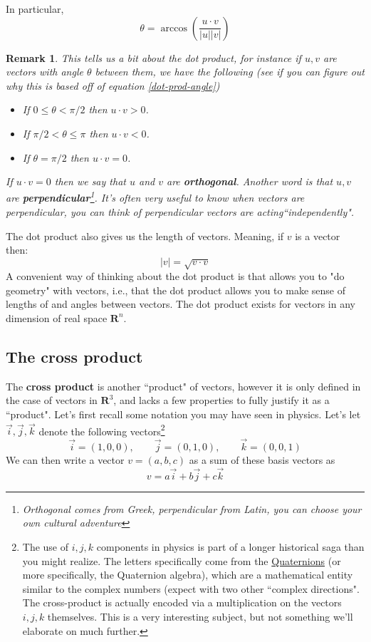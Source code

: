 \documentclass[12pt]{article}
\numberwithin{equation}{subsection}
\numberwithin{figure}{subsection}
\theoremstyle{note}
\newtheorem{remark}[subsection]{Remark}
\begin{document}
{In particular, \[\theta=\arccos\left( \dfrac{u\cdot v}{|u||v|}\right)\]
\begin{remark} This tells us a bit about the dot product, for instance if $u,v$ are vectors with angle $\theta$ between them, we have the following (see if you can figure out why this is based off of equation \eqref{dot-prod-angle})
\begin{itemize}
	\item If $0\leq \theta< \pi/2$ then $u\cdot v>0$.
	\item If $\pi/2 < \theta \leq \pi$ then $u\cdot v<0$.
	\item If $\theta=\pi/2$ then $u\cdot v=0$.
\end{itemize}
If $u\cdot v=0$ then we say that $u$ and $v$ are \textbf{orthogonal}. Another word is that $u,v$ are \textbf{perpendicular}\footnote{Orthogonal comes from Greek, perpendicular from Latin, you can choose your own cultural adventure}. It's often very useful to know when vectors are perpendicular, you can think of perpendicular vectors are acting``independently".
\end{remark}

The dot product also gives us the {length} of vectors. Meaning, if $v$ is a vector then: \begin{equation} |v|=\sqrt{v\cdot v}\end{equation}
A convenient way of thinking about the dot product is that allows you to "do geometry" with vectors, i.e., that the dot product allows you to make sense of lengths of and angles between vectors. The dot product exists for vectors in any dimension of real space $\mathbf{R}^n$.

\subsection{The cross product} The \textbf{cross product} is another ``product" of vectors, however it is only defined in the case of vectors in $\mathbf{R}^3$, and lacks a few properties to fully justify it as a ``product". Let's first recall some notation you may have seen in physics. Let's let $\vec{i},\vec{j},\vec{k}$ denote the following vectors\footnote{The use of $i,j,k$ components in physics is part of a longer historical saga than you might realize. The letters specifically come from the \href{https://en.wikipedia.org/wiki/Quaternion}{Quaternions} (or more specifically, the Quaternion algebra), which are a mathematical entity similar to the complex numbers (expect with two other ``complex directions". The cross-product is actually encoded via a multiplication on the vectors $i,j,k$ themselves. This is a very interesting subject, but not something we'll elaborate on much further.}
\[ \vec{i}=(1,0,0), \qquad \vec{j}=(0,1,0), \qquad \vec{k}=(0,0,1)\]
We can then write a vector $v=(a,b,c)$ as a sum of these basis vectors as \[ v=a\vec{i}+b\vec{j}+c\vec{k}\]

}
\end{document}
